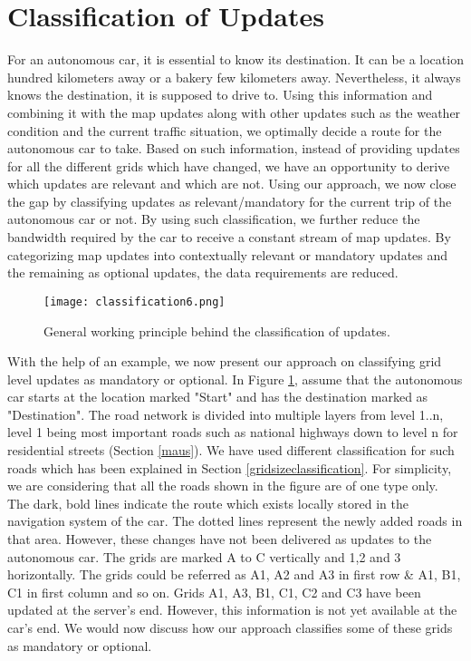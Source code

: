\section{Classification of Updates} \label{classificationofupdates}
For an autonomous car, it is essential to know its destination. It can be a location hundred kilometers away or a bakery few kilometers away. Nevertheless, it always knows the destination, it is supposed to drive to. Using this information and combining it with the map updates along with other updates such as the weather condition and the current traffic situation, we optimally decide a route for the autonomous car to take. Based on such information, instead of providing updates for all the different grids which have changed, we have an opportunity to derive which updates are relevant and which are not. Using our approach, we now close the gap by classifying updates as relevant/mandatory for the current trip of the autonomous car or not. By using such classification, we further reduce the bandwidth required by the car to receive a constant stream of map updates. By categorizing map updates into contextually relevant or mandatory updates and the remaining as optional updates, the data requirements are reduced. \\

\begin{figure}
\centering
\texttt{[image: classification6.png]}
\caption{General working principle behind the classification of updates.}
\label{fg:classificationofmapupdate}
\end{figure}

With the help of an example, we now present our approach on classifying grid level updates as mandatory or optional. In Figure \ref{fg:classificationofmapupdate}, assume that the autonomous car starts at the location marked "Start" and has the destination marked as "Destination". The road network is divided into multiple layers from level 1..n, level 1 being most important roads such as national highways down to level n for residential streets (Section \ref{maus}). We have used different classification for such roads which has been explained in Section \ref{gridsizeclassification}. For simplicity, we are considering that all the roads shown in the figure are of one type only. The dark, bold lines indicate the route which exists locally stored in the navigation system of the car. The dotted lines represent the newly added roads in that area. However, these changes have not been delivered as updates to the autonomous car. The grids are marked A to C vertically and 1,2 and 3 horizontally. The grids could be referred as A1, A2 and A3 in first row \& A1, B1, C1 in first column and so on. Grids A1, A3, B1, C1, C2 and C3 have been updated at the server's end. However, this information is not yet available at the car's end. We would now discuss how our approach classifies some of these grids as mandatory or optional.
